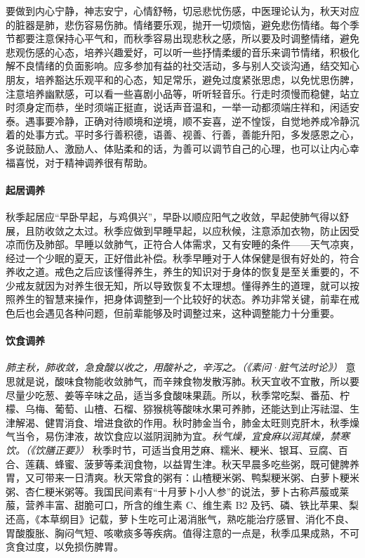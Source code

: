 要做到内心宁静，神志安宁，心情舒畅，切忌悲忧伤感，中医理论认为，秋天对应的脏器是肺，悲伤容易伤肺。情绪要乐观，抛开一切烦恼，避免悲伤情绪。每个季节都要注意保持心平气和，而秋季容易出现悲秋之感，所以要及时调整情绪，避免悲观伤感的心态，培养兴趣爱好，可以听一些抒情柔缓的音乐来调节情绪，积极化解不良情绪的负面影响。应多参加有益的社交活动，多与别人交谈沟通，结交知心朋友，培养豁达乐观平和的心态，知足常乐，避免过度紧张思虑，以免忧思伤脾，注意培养幽默感，可以看一些喜剧小品等，听听轻音乐。行走时须慢而稳健，站立时须身定而恭，坐时须端正挺直，说话声音温和，一举一动都须端庄祥和，闲适安泰。遇事要冷静，正确对待顺境和逆境，顺不妄喜，逆不惶馁，自觉地养成冷静沉着的处事方式。平时多行善积德，语善、视善、行善，善能升阳，多发感恩之心，多说鼓励人、激励人、体贴柔和的话，为善可以调节自己的心理，也可以让内心幸福喜悦，对于精神调养很有帮助。

\paragraph{起居调养}

秋季起居应“早卧早起，与鸡俱兴”，早卧以顺应阳气之收敛，早起使肺气得以舒展，且防收敛之太过。秋季应做到早睡早起，以应秋候，注意添加衣物，防止因受凉而伤及肺部。早睡以敛肺气，正符合人体需求，又有安睡的条件——天气凉爽，经过一个少眠的夏天，正好借此补偿。秋季早睡对于人体保健是很有好处的，符合养收之道。戒色之后应该懂得养生，养生的知识对于身体的恢复是至关重要的，不少戒友就因为对养生很无知，所以导致恢复不太理想。懂得养生的道理，就可以按照养生的智慧来操作，把身体调整到一个比较好的状态。养功非常关键，前辈在戒色后也会遇见各种问题，但前辈能够及时调整过来，这种调整能力十分重要。

\paragraph{饮食调养}

\textit{肺主秋，肺收敛，急食酸以收之，用酸补之，辛泻之。（《素问·脏气法时论》）} 意思就是说，酸味食物能收敛肺气，而辛辣食物发散泻肺。秋天宜收不宜散，所以要尽量少吃葱、姜等辛味之品，适当多食酸味果蔬。所以，秋季常吃梨、番茄、柠檬、乌梅、葡萄、山楂、石榴、猕猴桃等酸味水果可养肺，还能达到止泻祛湿、生津解渴、健胃消食、增进食欲的作用。秋时肺金当令，肺金太旺则克肝木，秋季燥气当令，易伤津液，故饮食应以滋阴润肺为宜。\textit{秋气燥，宜食麻以润其燥，禁寒饮。（《饮膳正要》）} 秋季时节，可适当食用芝麻、糯米、粳米、银耳、豆腐、百合、莲藕、蜂蜜、菠萝等柔润食物，以益胃生津。秋天早晨多吃些粥，既可健脾养胃，又可带来一日清爽。秋天常食的粥有：山楂粳米粥、鸭梨粳米粥、白萝卜粳米粥、杏仁粳米粥等。我国民间素有“十月萝卜小人参”的说法，萝卜古称芦菔或莱菔，营养丰富、甜脆可口，所含的维生素 C、维生素 B2 及钙、磷、铁比苹果、梨还高，《本草纲目》记载，萝卜生吃可止渴消胀气，熟吃能治疗感冒、消化不良、胃酸腹胀、胸闷气短、咳嗽痰多等疾病。值得注意的一点是，秋季瓜果成熟，不可贪食过度，以免损伤脾胃。

